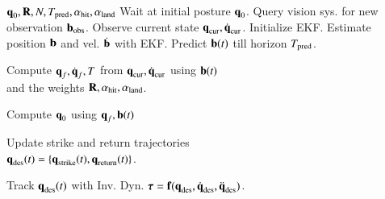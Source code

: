 \begin{algorithm}[t]
	\begin{mdframed}
		\small\sf%
		\caption{$\AlgTwo$ ($\algTwo$)}
		\label{alg2}
		\begin{minipage}{\linewidth}
			\begin{algorithmic}[1]
				\Require $\boldsymbol{\mathrm{q}}_{0}, \boldsymbol{\mathrm{R}}, N, T_{\mathrm{pred}}, \alpha_{\mathrm{hit}}, \alpha_{\mathrm{land}}$ %
				\State Wait at initial posture $\boldsymbol{\mathrm{q}}_{0}$.
				\Loop
				\State Query vision sys. for new observation $\boldsymbol{\mathrm{b}}_{\mathrm{obs}}$.
				\State Observe current state $\boldsymbol{\mathrm{q}}_{\mathrm{cur}}, \dot{\boldsymbol{\mathrm{q}}}_{\mathrm{cur}}$.
				\State Initialize EKF.
				\EndIf
				\State Estimate position $\boldsymbol{\mathrm{b}}$ and vel. $\dot{\boldsymbol{\mathrm{b}}}$ with EKF.
				\State Predict $\boldsymbol{\mathrm{b}}(t)$ till horizon $T_{\mathrm{pred}}$.
				\State \parbox[t]{\dimexpr\linewidth-\algorithmicindent}{Compute $\boldsymbol{\mathrm{q}}_f, \dot{\boldsymbol{\mathrm{q}}}_f, T$ from $\boldsymbol{\mathrm{q}}_{\mathrm{cur}}, \dot{\boldsymbol{\mathrm{q}}}_{\mathrm{cur}}$ using $\boldsymbol{\mathrm{b}}(t)$ \\and the weights $\boldsymbol{\mathrm{R}}, \alpha_{\mathrm{hit}}, \alpha_{\mathrm{land}}$.}
				\State Compute $\boldsymbol{\mathrm{q}}_0$ using $\boldsymbol{\mathrm{q}}_f, \boldsymbol{\mathrm{b}}(t)$ %
				\State \parbox[t]{\dimexpr\linewidth-\algorithmicindent}{Update strike and return trajectories \\$\boldsymbol{\mathrm{q}}_{\mathrm{des}}(t) = \{\boldsymbol{\mathrm{q}}_{\mathrm{strike}}(t), \boldsymbol{\mathrm{q}}_{\mathrm{return}}(t)\}$.}
				\EndIf
				\State \parbox[t]{\dimexpr\linewidth-\algorithmicindent}{Track $\boldsymbol{\mathrm{q}}_{\mathrm{des}}(t)$ with Inv. Dyn. $\boldsymbol{\mathrm{\tau}} = \boldsymbol{\mathrm{f}}(\boldsymbol{\mathrm{q}}_{\mathrm{des}},\dot{\boldsymbol{\mathrm{q}}}_{\mathrm{des}},\ddot{\boldsymbol{\mathrm{q}}}_{\mathrm{des}})$.} %
				\EndLoop
			\end{algorithmic}
		\end{minipage}
	\end{mdframed}
\end{algorithm}